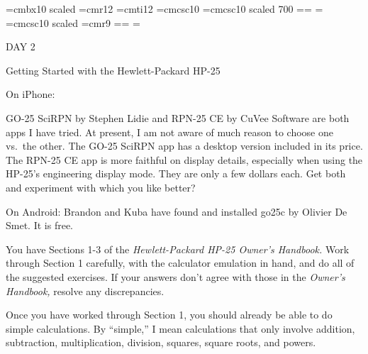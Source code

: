 
\def\folio{\ifnum\pageno>0 \number\pageno \else
   \ifnum\pageno<0 \romannumeral-\pageno \else\fi\fi}

\font\largebf=cmbx10  scaled 
\font\largerm=cmr12
\font\largeit=cmti12
\font\tensc=cmcsc10
\font\sevensc=cmcsc10 scaled 700
\newfam\scfam \def\sc{\fam\scfam\tensc}
\textfont\scfam=\tensc \scriptfont\scfam=\sevensc
\scriptscriptfont\scfam=\sevensc
\font\largesc=cmcsc10 scaled 
\font\ninerm=cmr9
\newfam\srfam \def\sr{\fam\srfam\ninerm}
\textfont\srfam=\ninerm \scriptfont\srfam=\sevenrm
\scriptscriptfont\srfam=\fiverm




\null\vskip36pt

\centerline{\largerm DAY 2}
\nobreak\bigskip

\centerline{\largeit Getting Started with the Hewlett-Packard HP-25}
\nobreak\bigskip

\nobreak\bigskip

\noindent On iPhone:
\nobreak\bigskip

\noindent GO-25 SciRPN by Stephen Lidie and RPN-25 CE  by CuVee Software are both apps I have tried. At present, I am not aware of much reason to choose one vs.\ the other. The GO-25 SciRPN app has a desktop version included in its price. The RPN-25 CE app is more faithful on display details, especially when using the HP-25's engineering display mode. They are only a few dollars each. Get both and experiment with which you like better?
\bigskip

\noindent On Android:
\nobreak\bigskip
\noindent Brandon and Kuba have found and installed go25c by Olivier De Smet. It is free.
\bigskip

\nobreak\bigskip

\noindent You have Sections 1-3 of the {\it Hewlett-Packard HP-25 Owner's Handbook.} Work through Section 1 carefully, with the calculator emulation in hand, and do all of the suggested exercises. If your answers don't agree with those in the {\it Owner's Handbook,} resolve any discrepancies.
\bigskip

\nobreak\bigskip

\noindent Once you have worked through Section 1, you should already be able to do simple calculations. By ``simple,'' I mean calculations that only involve addition, subtraction, multiplication, division, squares, square roots, and powers.

